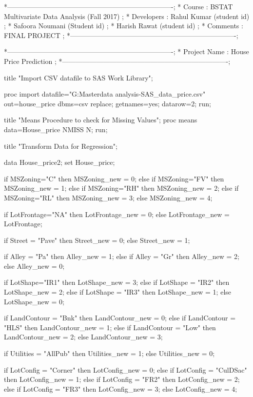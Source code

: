 *-------------------------------------------------------------------------;
* Course	     : BSTAT  Multivariate Data Analysis	(Fall 2017)	      ;
* Developers	 : Rahul Kumar (student id)								  ;
* 				   Safoora Noumani (Student id)							  ;
*				   Harish Rawat (student id)								  ;
* Comments       : FINAL PROJECT   										  ;
*-------------------------------------------------------------------------;

*-------------------------------------------------------------------------;
* Project Name		: House Price Prediction							  ;
*-------------------------------------------------------------------------;

title "Import CSV datafile to SAS Work Library";

proc import datafile="G:\Stevens Master\multivariate data analysis-SAS\RAW_data\house_price.csv"
     out=house_price
     dbms=csv
     replace;
     getnames=yes;
	 datarow=2;
run;

title	"Means Procedure to check for Missing Values";
proc means data=House_price NMISS N; 
run;

title "Transform Data for Regression";

data House_price2;
	set House_price;

		if 		MSZoning="C"  	then MSZoning_new = 0;
		else if MSZoning="FV"  	then MSZoning_new = 1;
		else if MSZoning="RH"  	then MSZoning_new = 2;
		else if MSZoning="RL"  	then MSZoning_new = 3;
		else MSZoning_new = 4;

		if LotFrontage="NA"		then LotFrontage_new = 0;
		else LotFrontage_new = LotFrontage;

		if Street = "Pave"			then Street_new = 0;
		else Street_new = 1;

		if Alley = "Pa"			then Alley_new = 1;
		else if Alley = "Gr"		then Alley_new = 2;
		else Alley_new = 0;

		if LotShape="IR1" then LotShape_new  = 3;
		else if LotShape = "IR2" then LotShape_new = 2;
		else if LotShape = "IR3" then LotShape_new = 1;
		else LotShape_new = 0;

		if LandContour = "Bnk" 			then LandContour_new = 0;
		else if LandContour = "HLS" 	then LandContour_new = 1;
		else if LandContour = "Low" 	then LandContour_new = 2;
		else  LandContour_new = 3;

		if Utilities = "AllPub"			then Utilities_new = 1;
		else Utilities_new = 0;

		if LotConfig = "Corner" 		then LotConfig_new = 0;
		else if LotConfig = "CulDSac" 	then LotConfig_new = 1;
		else if LotConfig = "FR2"		then LotConfig_new = 2;
		else if LotConfig = "FR3" 		then LotConfig_new = 3;
		else  LotConfig_new = 4;

